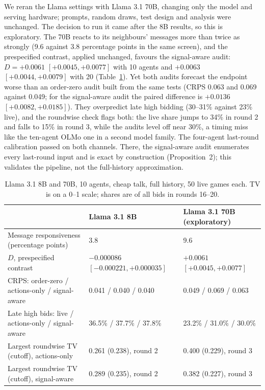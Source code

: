 \documentclass[11pt,letterpaper]{article}
\begin{document}
We reran the Llama settings with Llama 3.1 70B, changing only the model and serving hardware; prompts, random draws, test design and analysis were unchanged.
The decision to run it came after the 8B results, so this is exploratory.
The 70B reacts to its neighbours' messages more than twice as strongly (9.6 against 3.8 percentage points in the same screen), and the prespecified contrast, applied unchanged, favours the signal-aware audit: $D = +0.0061$ $[+0.0045, +0.0077]$ with 10 agents and $+0.0063$ $[+0.0044, +0.0079]$ with 20 (Table~\ref{tab:70b}).
Yet both audits forecast the endpoint worse than an order-zero audit built from the same tests (CRPS 0.063 and 0.069 against 0.049; for the signal-aware audit the paired difference is $+0.0136$ $[+0.0082, +0.0185]$).
They overpredict late high bidding (30--31\% against 23\% live), and the roundwise check flags both: the live share jumps to 34\% in round 2 and falls to 15\% in round 3, while the audits level off near 30\%, a timing miss like the ten-agent OLMo one in a second model family.
The four-agent last-round calibration passed on both channels. There, the signal-aware audit enumerates every last-round input and is exact by construction (Proposition~2); this validates the pipeline, not the full-history approximation.

\begin{table}[H]
  \centering\small
  \caption{Llama 3.1 8B and 70B, 10 agents, cheap talk, full history, 50 live games each. TV is on a 0--1 scale; shares are of all bids in rounds 16--20.}
  \label{tab:70b}
  \begin{tabular}{@{}lll@{}}
    \toprule
    & Llama 3.1 8B & Llama 3.1 70B (exploratory) \\
    \midrule
    Message responsiveness (percentage points) & 3.8 & 9.6 \\
    $D$, prespecified contrast & $-0.000086$ $[-0.000221, +0.000035]$ & $+0.0061$ $[+0.0045, +0.0077]$ \\
    CRPS: order-zero / actions-only / signal-aware & 0.041 / 0.040 / 0.040 & 0.049 / 0.069 / 0.063 \\
    Late high bids: live / actions-only / signal-aware & 36.5\% / 37.7\% / 37.8\% & 23.2\% / 31.0\% / 30.0\% \\
    Largest roundwise TV (cutoff), actions-only & 0.261 (0.238), round 2 & 0.400 (0.229), round 3 \\
    Largest roundwise TV (cutoff), signal-aware & 0.289 (0.235), round 2 & 0.382 (0.227), round 3 \\
    \bottomrule
  \end{tabular}
\end{table}
\end{document}
